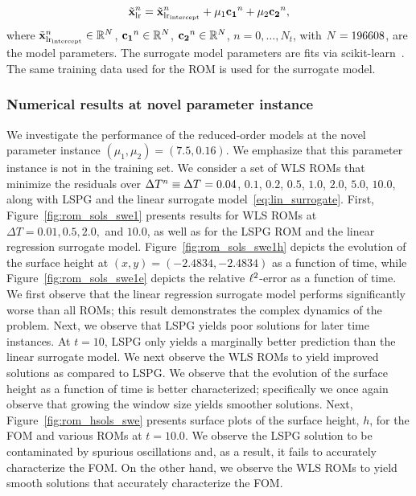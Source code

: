 \begin{equation}\label{eq:lin_surrogate}
\tilde{\mathbf{x}}_{\text{lr}}^n = {\tilde{\mathbf{x}}_{\text{lr}_{\text{intercept}}}}^n + \mu_1 \mathbf{c_1}^n + \mu_2 \mathbf{c_2}^n ,
\end{equation}
where $\tilde{\mathbf{x}}_{\text{lr}_{\text{intercept}}}^n \in \mathbb{R}^{N}$, $\mathbf{c_1}^n \in \mathbb{R}^{N}$, $\mathbf{c_2}^n \in \mathbb{R}^{N}$, $n=0,\ldots,N_t$, with $N = 196608$, are the model parameters. 
The surrogate model parameters are fits via \textsf{scikit-learn}~\cite{scikit-learn}. The same training data used for the ROM is used for the surrogate model.

\subsubsection{Numerical results at novel parameter instance}\label{sec:swe_results}
We investigate the performance of the reduced-order models at the novel parameter instance $(\mu_1, \mu_2) = (7.5,0.16)$. We emphasize that this parameter instance is not in the training set. We consider a set of WLS ROMs that minimize the residuals over $\Delta T^{n} \equiv \Delta T^{} = 0.04$, $0.1$, $0.2$, $0.5$, $1.0$, $2.0$, $5.0$, $10.0$, along with LSPG and the linear surrogate model~\eqref{eq:lin_surrogate}. First, Figure~\ref{fig:rom_sols_swe1} presents results for WLS ROMs at $\Delta T = 0.01,0.5,2.0,$ and $10.0$, as well as for the LSPG ROM and the linear regression surrogate model. Figure~\ref{fig:rom_sols_swe1h} depicts the evolution of the surface height at $(x,y) = (-2.4834,-2.4834)$ as a function of time, while Figure~\ref{fig:rom_sols_swe1e} depicts the relative $\ell^2$-error as a function of time. We first observe that the linear regression surrogate model performs significantly worse than all ROMs; this result demonstrates the complex dynamics of the problem. Next, we observe that LSPG yields poor solutions for later time instances. At $t=10$, LSPG only yields a marginally better prediction than the linear surrogate model. We next observe the WLS ROMs to yield improved solutions as compared to LSPG. We observe that the evolution of the surface height as a function of time is better characterized; specifically we once again observe that growing the window size yields smoother solutions. Next, Figure~\ref{fig:rom_hsols_swe} presents surface plots of the surface height, $h$, for the FOM and various ROMs at $t = 10.0$. We observe the LSPG solution to be contaminated by spurious oscillations and, as a result, it fails to accurately characterize the FOM. On the other hand, we observe the WLS ROMs to yield smooth solutions that accurately characterize the FOM.
 


